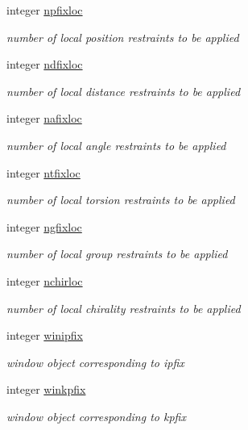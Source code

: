 \begin{DoxyCompactItemize}
integer \hyperlink{classkgeoms_af961bd2102c0e750b416400a19714f59}{npfixloc}
\begin{DoxyCompactList}\small\item\em number of local position restraints to be applied \end{DoxyCompactList}\item 
integer \hyperlink{classkgeoms_a424e1211b0caf006b3ebbda43eb634fa}{ndfixloc}
\begin{DoxyCompactList}\small\item\em number of local distance restraints to be applied \end{DoxyCompactList}\item 
integer \hyperlink{classkgeoms_a506676025df9a1087d5380bfa10f7b79}{nafixloc}
\begin{DoxyCompactList}\small\item\em number of local angle restraints to be applied \end{DoxyCompactList}\item 
integer \hyperlink{classkgeoms_a0036a81dba74f033a8902369ec7e96f7}{ntfixloc}
\begin{DoxyCompactList}\small\item\em number of local torsion restraints to be applied \end{DoxyCompactList}\item 
integer \hyperlink{classkgeoms_a676005c8b83a0f2a3ceb53b41ab9db67}{ngfixloc}
\begin{DoxyCompactList}\small\item\em number of local group restraints to be applied \end{DoxyCompactList}\item 
integer \hyperlink{classkgeoms_a8c919c07a701205fa46340965d23f450}{nchirloc}
\begin{DoxyCompactList}\small\item\em number of local chirality restraints to be applied \end{DoxyCompactList}\item 
integer \hyperlink{classkgeoms_ac7889d0d333527feba2dfdaaee41c789}{winipfix}
\begin{DoxyCompactList}\small\item\em window object corresponding to ipfix \end{DoxyCompactList}\item 
integer \hyperlink{classkgeoms_adba1e0f07cf17d58c8d677eaa8a1c2f8}{winkpfix}
\begin{DoxyCompactList}\small\item\em window object corresponding to kpfix \end{DoxyCompactList}\item 

\end{DoxyCompactItemize}
